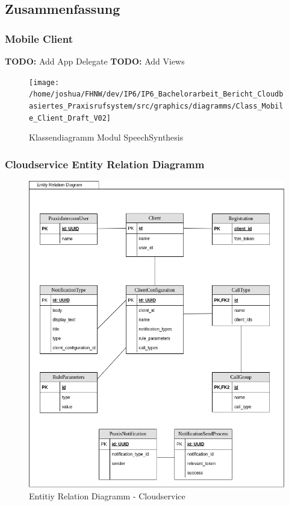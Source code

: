 \subsection{Zusammenfassung}

\subsubsection{Mobile Client}

\textbf{TODO: } Add App Delegate
\textbf{TODO: } Add Views
\begin{figure}[h]
    \centering
    \begin{minipage}[b]{0.92\textwidth}
        \texttt{[image: /home/joshua/FHNW/dev/IP6/IP6\_Bachelorarbeit\_Bericht\_Cloudbasiertes\_Praxisrufsystem/src/graphics/diagramms/Class\_Mobile\_Client\_Draft\_V02]}
        \caption{Klassendiagramm Modul SpeechSynthesis}
    \end{minipage}
\end{figure}
\clearpage

\clearpage

\subsubsection{Cloudservice Entity Relation Diagramm}

\begin{figure}[h]
    \centering
    \begin{minipage}[b]{0.9\textwidth}
        \includegraphics[width=\textwidth]{graphics/diagramms/erd_v02}
        \caption{Entitiy Relation Diagramm - Cloudservice}
    \end{minipage}
\end{figure}

